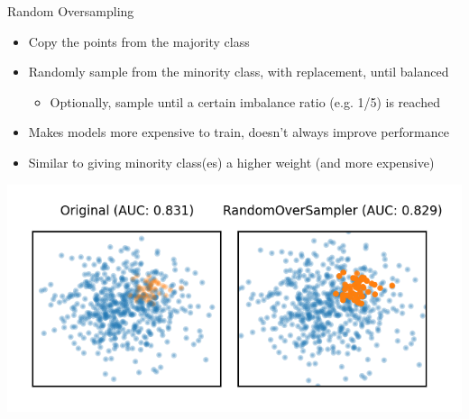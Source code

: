 \begin{frame}[allowframebreaks]{Random Oversampling}
\begin{itemize}
    \item Copy the points from the majority class
    \item Randomly sample from the minority class, with replacement, until balanced
    \begin{itemize}
        \item Optionally, sample until a certain imbalance ratio (e.g. 1/5) is reached
    \end{itemize}
    \item Makes models more expensive to train, doesn't always improve performance
    \item Similar to giving minority class(es) a higher weight (and more expensive)
\end{itemize}

\begin{center}
    \includegraphics[width=0.75\linewidth]{images/pre-processing/random-oversampling.png}
\end{center}
\end{frame}


